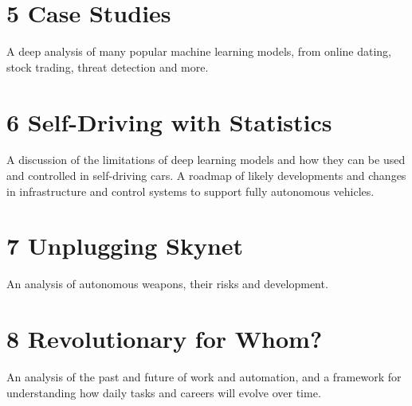 \section*{5 Case Studies}

A deep analysis of many popular machine learning models, from online dating, stock trading, threat detection and more.

\section*{6 Self-Driving with Statistics}

A discussion of the limitations of deep learning models and how they can be used and controlled in self-driving cars. A roadmap of likely developments and changes in infrastructure and control systems to support fully autonomous vehicles.

\section*{7 Unplugging Skynet}

An analysis of autonomous weapons, their risks and development. 

\section*{8 Revolutionary for Whom?}

An analysis of the past and future of work and automation, and a framework for understanding how daily tasks and careers will evolve over time.
